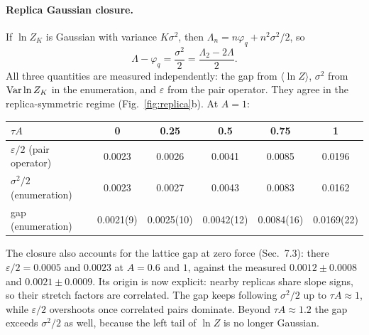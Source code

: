\documentclass[10pt,a4paper]{article}
\begin{document}
\paragraph{Replica Gaussian closure.}
If $\ln Z_K$ is Gaussian with variance $K\sigma^2$, then $\Lambda_n=n\varphi_q+n^2\sigma^2/2$, so
\begin{equation}
\Lambda-\varphi_q=\frac{\sigma^2}2=\frac{\Lambda_2-2\Lambda}2 .
\label{eq:closure}
\end{equation}
All three quantities are measured independently: the gap from $\langle\ln Z\rangle$, $\sigma^2$ from ${\rm Var}\ln Z_K$ in the enumeration, and $\varepsilon$ from the pair operator.
They agree in the replica-symmetric regime (Fig.~\ref{fig:replica}b). At $A=1$:
\begin{center}\footnotesize
\begin{tabular}{lccccc}
\toprule
$\tau A$ & 0 & 0.25 & 0.5 & 0.75 & 1 \\
\midrule
$\varepsilon/2$ (pair operator) & 0.0023 & 0.0026 & 0.0041 & 0.0085 & 0.0196 \\
$\sigma^2/2$ (enumeration) & 0.0023 & 0.0027 & 0.0043 & 0.0083 & 0.0162 \\
gap (enumeration) & 0.0021(9) & 0.0025(10) & 0.0042(12) & 0.0084(16) & 0.0169(22) \\
\bottomrule
\end{tabular}
\end{center}
The closure also accounts for the lattice gap at zero force (Sec.~7.3): there $\varepsilon/2=0.0005$ and $0.0023$ at $A=0.6$ and $1$, against the measured $0.0012\pm0.0008$ and $0.0021\pm0.0009$. Its origin is now explicit: nearby replicas share slope signs, so their stretch factors are correlated.
The gap keeps following $\sigma^2/2$ up to $\tau A\approx1$, while $\varepsilon/2$ overshoots once correlated pairs dominate. Beyond $\tau A\approx1.2$ the gap exceeds $\sigma^2/2$ as well, because the left tail of $\ln Z$ is no longer Gaussian.
\end{document}
